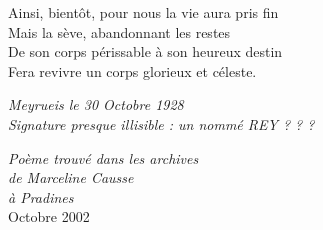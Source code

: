 \begin{center}
\begin{minipage}{0.55\textwidth}
\vspace{0.35cm}

Ainsi, bientôt, pour nous la vie aura pris fin\\
Mais la sève, abandonnant les restes\\
De son corps périssable à son heureux destin\\
Fera revivre un corps glorieux et céleste.

\vspace{0.55cm}

\textit{Meyrueis le 30 Octobre 1928}\\
\textit{Signature presque illisible : un nommé REY ? ? ?}

\end{minipage}
\end{center}

\vfill

\begin{flushright}
\textit{Poème trouvé dans les archives}\\
\textit{de Marceline Causse}\\
\textit{à Pradines}\\[0.15cm]
Octobre 2002
\end{flushright}
